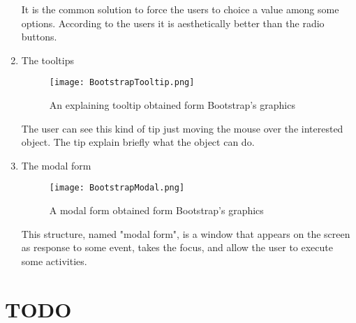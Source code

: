 \begin{enumerate}
It is the common solution to force the users to choice a value among some options. According to the users it is aesthetically better than the radio buttons.

\item The tooltips

\begin{figure}[H]
\centering
\texttt{[image: BootstrapTooltip.png]} 
\caption{An explaining tooltip obtained form Bootstrap's graphics}
\end{figure}

The user can see this kind of tip just moving the mouse over the interested object. The tip explain briefly what the object can do.

\item The modal form

\begin{figure}[H]
\centering
\texttt{[image: BootstrapModal.png]} 
\caption{A modal form obtained form Bootstrap's graphics}
\end{figure}

This structure, named "modal form", is a window that appears on the screen as response to some event, takes the focus, and allow the user to execute some activities. 

\end{enumerate}

\section{TODO}
